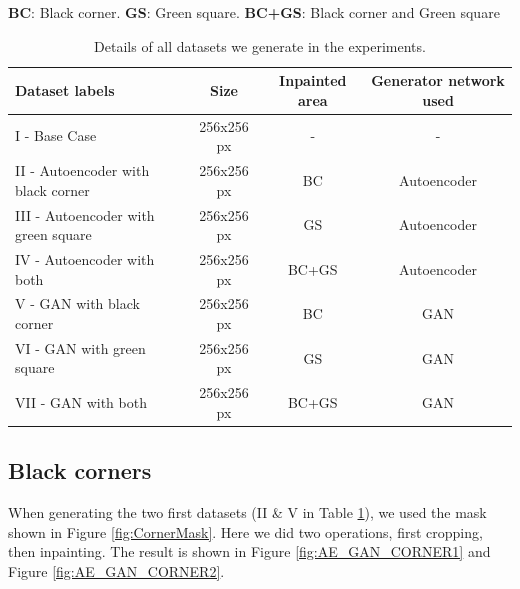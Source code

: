 \begin{table}[h]
\centering
\footnotesize
\caption*{\small \textbf{BC}: Black corner. \textbf{GS}: Green square. \textbf{BC+GS}: Black corner and Green square}
\begin{tabular}{lccc}
\toprule
{Dataset labels} & {Size} & {Inpainted area} & {Generator network used} \\ 
\midrule
I    - Base Case                       & 256x256 px         & -        & -                   \\
II   - Autoencoder with black corner   & 256x256 px         & BC       & Autoencoder         \\
III  - Autoencoder with green square   & 256x256 px         & GS       & Autoencoder         \\
IV   - Autoencoder with both           & 256x256 px         & BC+GS    & Autoencoder         \\
V    - GAN with black corner           & 256x256 px         & BC       & GAN                 \\
VI   - GAN with green square   		   & 256x256 px         & GS       & GAN                 \\
VII  - GAN with both                   & 256x256 px         & BC+GS    & GAN                 \\
\bottomrule
\end{tabular}%
\caption{Details of all datasets we generate in the experiments.} 
\label{tab:datasets}
\end{table}

\FloatBarrier
\subsection{Black corners}
When generating the two first datasets (II \& V in Table \ref{tab:datasets}), we used the mask shown in Figure \ref{fig:CornerMask}. Here we did two operations, first cropping, then inpainting. The result is shown in Figure \ref{fig:AE_GAN_CORNER1} and Figure \ref{fig:AE_GAN_CORNER2}.

